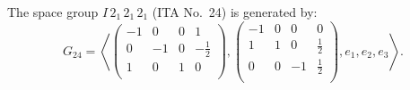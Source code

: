 The space group $I\, 2_1\, 2_1\, 2_1$ (ITA No.~24) is generated by:
$$
G_{24} = \left\langle\left(\begin{array}{rrr|r}
-1 & 0 & 0 & 1 \\
0 & -1 & 0 & -\frac{1}{2} \\
1 & 0 & 1 & 0 \\
\end{array}\right) , \left(\begin{array}{rrr|r}
-1 & 0 & 0 & 0 \\
1 & 1 & 0 & \frac{1}{2} \\
0 & 0 & -1 & \frac{1}{2} \\
\end{array}\right) , e_1 , e_2 , e_3\right\rangle.
$$


